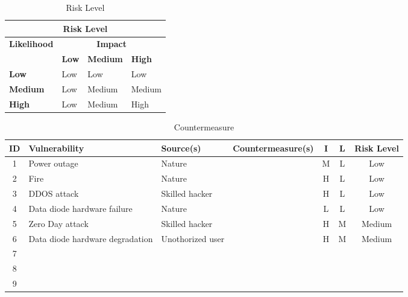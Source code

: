 \documentclass[a4paper,10pt]{article}
\begin{document}
\begin{table}[!h]
	\centering
	\begin{tabular}{|l|l|l|l|}
		\hline
		\multicolumn{4}{|c|}{\textbf{Risk Level}} \\
		\hline
		\textbf{Likelihood} & \multicolumn{3}{|c|}{\textbf{Impact}}  \\ \hline
		 & \textbf{Low} & \textbf{Medium} & \textbf{High} \\ \hline
		\textbf{Low}& Low & Low & Low \\ \hline
		\textbf{Medium} & Low & Medium & Medium \\ \hline
		\textbf{High} & Low & Medium & High \\ \hline
	\end{tabular}
	\caption{Risk Level}
	\label{table:RL}
\end{table}


\begin{table}[!h]
	\centering
	\begin{tabular}{|c|p{}|p{2.5cm}|p{6.5cm}|c|c|c|}
		\hline
		\textbf{ID}& \textbf{Vulnerability} & \textbf{Source(s)} & \textbf{Countermeasure(s)} & \textbf{I} & \textbf{L} & \textbf{Risk Level}          \\
		\hline
		1 & Power outage  & Nature & & M & L & Low \\
		\hline
		2 & Fire & Nature & & H & L & Low \\
		\hline
		3 & DDOS attack & Skilled hacker & & H & L & Low \\
		\hline
		4 & Data diode hardware failure & Nature & & L & L & Low \\
		\hline
		5 & Zero Day attack & Skilled hacker & & H & M & Medium \\
		\hline
		6 & Data diode hardware degradation & Unothorized user & & H & M & Medium  \\
		\hline
		7 & & & & & & \\
		\hline
		8 & & & & & & \\
		\hline
		9 & & & & & & \\
		\hline
	\end{tabular}
	\caption{Countermeasure}
\end{table}
\end{document}
